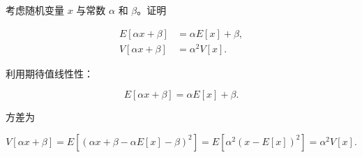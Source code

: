 \begin{question}
考虑随机变量 \(x\) 与常数 \(\alpha\) 和 \(\beta\)。证明

\[
\begin{split}
E[\alpha x+\beta]&=\alpha E[x]+\beta,\\
V[\alpha x+\beta]&=\alpha^2 V[x].
\end{split}
\]
\begin{solution}
利用期待值线性性：

\[
E[\alpha x+\beta]=\alpha E[x]+\beta.
\]

方差为

\[
V[\alpha x+\beta]=E[(\alpha x+\beta-\alpha E[x]-\beta)^2]
=E[\alpha^2(x-E[x])^2]=\alpha^2V[x].
\]
\end{solution}
\end{question}



